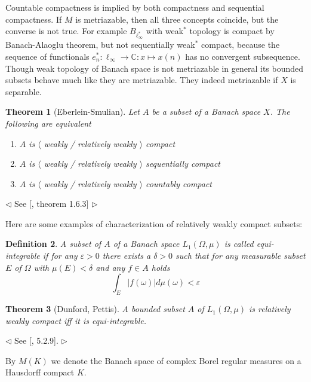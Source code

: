 \documentclass[12pt]{article}
\newtheorem{theorem}{Theorem}[section]
\newtheorem{definition}[theorem]{Definition}
\newenvironment{proof}{\par $\triangleleft$}{$\triangleright$}
\begin{document}
Countable compactness is implied by both compactness and sequential compactness.
If $M$ is metriazable, then all three concepts coincide, but the converse is not
true. For example $B_{\ell_\infty^*}$ with weak${}^*$ topology is compact by
Banach-Alaoglu theorem, but not sequentially weak${}^*$ compact, because the
sequence of functionals $e_n^*:\ell_\infty\to\mathbb{C}:x\mapsto x(n)$ has no
convergent subsequence. Though weak topology of Banach space is not metriazable
in general its bounded subsets behave much like they are metriazable. They
indeed metriazable if $X$ is separable.

\begin{theorem}[Eberlein-Smulian] Let $A$ be a subset of a Banach space $X$. The
    following are equivalent
    \begin{enumerate}[label = (\roman*)]
        \item $A$ is $\langle$ weakly / relatively weakly $\rangle$ compact
        \item $A$ is $\langle$ weakly / relatively weakly $\rangle$ sequentially
              compact
        \item $A$ is $\langle$ weakly / relatively weakly $\rangle$ countably
              compact
    \end{enumerate}
\end{theorem}
\begin{proof} See [\cite{KalAlbTopicsBanSpTh}, theorem 1.6.3]
\end{proof}

Here are some examples of characterization of relatively weakly compact subsets:

\begin{definition} A subset of $A$ of a Banach space $L_1(\Omega,\mu)$ is called
    equi-integrable if for any $\varepsilon>0$ there exists a $\delta>0$ such
    that for any measurable subset $E$ of $\Omega$ with $\mu(E)<\delta$ and any
    $f\in A$ holds
    $$
        \int_E |f(\omega)|d\mu(\omega)<\varepsilon
    $$
\end{definition}

\begin{theorem}[Dunford, Pettis] A bounded subset $A$ of $L_1(\Omega,\mu)$ is
    relatively weakly compact iff it is equi-integrable.
\end{theorem}
\begin{proof} See [\cite{KalAlbTopicsBanSpTh}, 5.2.9].
\end{proof}

By $M(K)$ we denote the Banach space of complex Borel regular measures on a
Hausdorff compact $K$.
\end{document}
